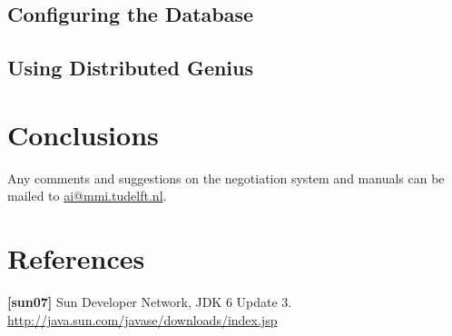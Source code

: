 \documentclass[]{article}
\begin{document}

\subsection{Configuring the Database}

\subsection{Using Distributed Genius}
 



\section{Conclusions}
Any comments and suggestions on the negotiation system and manuals can be mailed to \url{ai@mmi.tudelft.nl}.

\section{References}
\textbf{[sun07]} Sun Developer Network, JDK 6 Update 3. \url{http://java.sun.com/javase/downloads/index.jsp}

%
%
\end{document}
